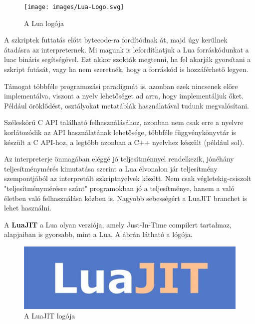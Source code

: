 \pagebreak

\begin{figure}[h]
\centering
\texttt{[image: images/Lua-Logo.svg]}
\caption{A Lua logója \cite{lua_logo}}
\label{fig:lua_logo}
\end{figure}

A szkriptek futtatás előtt bytecode-ra fordítódnak át, majd úgy kerülnek átadásra az interpreternek. Mi magunk is lefordíthatjuk a Lua forráskódunkat a luac bináris segítségével.
Ezt akkor szokták megtenni, ha fel akarják gyorsítani a szkript futását, vagy ha nem szeretnék, hogy a forráskód is hozzáférhető legyen.

Támogat többféle programozási paradigmát is, azonban ezek nincsenek előre implementálva, viszont a nyelv lehetőséget ad arra, hogy implementáljuk őket. Például öröklődést, osztályokat metatáblák használatával tudunk megvalósítani. \cite{ooplua}

Széleskörű C API található felhasználásához, azonban nem csak erre a nyelvre korlátozódik az API használatának lehetősége, többféle függvénykönyvtár is készült a C API-hoz, a legtöbb azonban a C++ nyelvhez készült (például sol). \cite{sol_vs_other_bindings} 

Az interpreterje önmagában eléggé jó teljesítménnyel rendelkezik, jónéhány teljesítménymérés kimutatása szerint a Lua élvonalon jár teljesítmény szempontjából az interpretált szkriptnyelvek között. Nem csak végletekig-csiszolt "teljesítménymérésre szánt" programokban jó a teljesítménye, hanem a való életben való felhasználása közben is. Nagyobb sebességért a LuaJIT branchet is lehet használni.

A \textbf{LuaJIT} a Lua olyan verziója, amely Just-In-Time compilert tartalmaz, alapjaiban is gyorsabb, mint a Lua. A  ábrán látható a lógója.

\begin{figure}[h]
\centering
\includegraphics[scale=0.15]{images/luajit-logo.jpg}
\caption{A LuaJIT logója \cite{luajit_logo}}
\label{fig:luajit_logo}
\end{figure}

